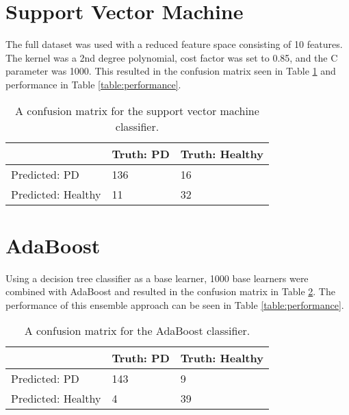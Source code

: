 \documentclass[draftcopy]{srpaper}
\begin{document}
\section{Support Vector Machine}
The full dataset was used with a reduced feature space consisting of
10 features. The kernel was a 2nd degree polynomial, cost factor was set to 0.85, and the C parameter was
1000. This resulted in the confusion matrix seen in Table
\ref{table:SVMCM} and performance in Table \ref{table:performance}.

\begin{table}
\begin{center}
\begin{tabular}{|l|l|l|}
\hline
 & Truth: PD & Truth: Healthy \\ \hline
Predicted: PD & 136 & 16 \\ \hline
Predicted: Healthy &  11 & 32 \\ \hline

\end{tabular}
\end{center}
\caption[Confusion Matrix for Neural Network]{A confusion matrix for
  the support vector machine classifier.}
\label{table:SVMCM}
\end{table}

\section{AdaBoost}
Using a decision tree classifier as a base learner, 1000 base learners
were combined with AdaBoost and
resulted in the confusion matrix in Table \ref{table:ABCM}. The
performance of this ensemble approach can be seen in Table \ref{table:performance}.

\begin{table}
\begin{center}
\begin{tabular}{|l|l|l|}
\hline

 & Truth: PD & Truth: Healthy \\ \hline
Predicted: PD & 143 & 9 \\ \hline
Predicted: Healthy &  4 & 39 \\ \hline

\end{tabular}
\end{center}
\caption[Confusion Matrix for AdaBoost]{A confusion matrix for
  the AdaBoost classifier.}
\label{table:ABCM}
\end{table}
\end{document}
